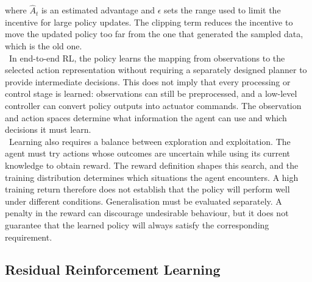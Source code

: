 %
where \(\hat{A}_t\) is an estimated advantage and \(\epsilon\) sets the
range used to limit the incentive for large policy updates. The clipping term
reduces the incentive to move the updated policy too far from the one that
generated the sampled data, which is the old one.\\
\
In end-to-end RL, the policy learns the mapping from observations to the
selected action representation without requiring a separately designed planner
to provide intermediate decisions. This does not imply that every processing
or control stage is learned: observations can still be preprocessed, and a
low-level controller can convert policy outputs into actuator commands. The
observation and action spaces determine what information the agent can use and
which decisions it must learn.\\
\
Learning also requires a balance between exploration and exploitation. The
agent must try actions whose outcomes are uncertain while using its current
knowledge to obtain reward. The reward definition shapes this search, and the
training distribution determines which situations the agent encounters. A high
training return therefore does not establish that the policy will perform well
under different conditions. Generalisation must be evaluated separately. A
penalty in the reward can discourage undesirable behaviour, but it does not
guarantee that the learned policy will always satisfy the corresponding
requirement.

\subsection{Residual Reinforcement Learning}

